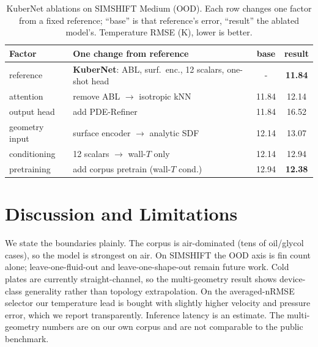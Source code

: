 \documentclass[conference]{IEEEtran}
\begin{document}
\begin{table}[t]\renewcommand{\arraystretch}{1.2}
\caption{KuberNet ablations on SIMSHIFT Medium (OOD). Each row changes one factor from a fixed reference; ``base'' is that reference's error, ``result'' the ablated model's. Temperature RMSE (K), lower is better.}
\label{tab:abl}\centering
\begin{tabular}{@{}l p{3.2cm} c c@{}}\toprule
Factor & One change from reference & base & result \\ \midrule
reference & \textbf{KuberNet}: ABL, surf.\ enc., 12 scalars, one-shot head & - & \textbf{11.84} \\
attention & remove ABL $\to$ isotropic kNN & 11.84 & 12.14 \\
output head & add PDE-Refiner & 11.84 & 16.52 \\
geometry input & surface encoder $\to$ analytic SDF & 12.14 & 13.07 \\
conditioning & 12 scalars $\to$ wall-$T$ only & 12.14 & 12.94 \\
pretraining & add corpus pretrain (wall-$T$ cond.) & 12.94 & \textbf{12.38} \\ \bottomrule
\end{tabular}
\end{table}

\section{Discussion and Limitations}
We state the boundaries plainly. The corpus is air-dominated (tens of oil/glycol cases), so the model
is strongest on air. On SIMSHIFT the OOD axis is fin count alone; leave-one-fluid-out and
leave-one-shape-out remain future work. Cold plates are currently straight-channel, so the
multi-geometry result shows device-class generality rather than topology extrapolation. On the
averaged-nRMSE selector our temperature lead is bought with slightly higher velocity and pressure
error, which we report transparently. Inference latency is an estimate. The multi-geometry numbers are on our
own corpus and are not comparable to the public benchmark.
\end{document}
